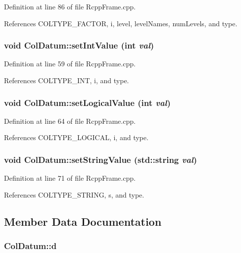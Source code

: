 Definition at line 86 of file RcppFrame.cpp.

References COLTYPE\_\-FACTOR, i, level, levelNames, numLevels, and type.\hypertarget{classColDatum_a80d401e1efb6e714113990c78e72eb84}{
\subsubsection[{setIntValue}]{\setlength{\rightskip}{0pt plus 5cm}void ColDatum::setIntValue (int {\em val})}}
\label{classColDatum_a80d401e1efb6e714113990c78e72eb84}


Definition at line 59 of file RcppFrame.cpp.

References COLTYPE\_\-INT, i, and type.\hypertarget{classColDatum_a19ebd9c0e3e2544c8679999ab91c9e20}{
\subsubsection[{setLogicalValue}]{\setlength{\rightskip}{0pt plus 5cm}void ColDatum::setLogicalValue (int {\em val})}}
\label{classColDatum_a19ebd9c0e3e2544c8679999ab91c9e20}


Definition at line 64 of file RcppFrame.cpp.

References COLTYPE\_\-LOGICAL, i, and type.\hypertarget{classColDatum_aa87060ae6c415167d501c41684d8a586}{
\subsubsection[{setStringValue}]{\setlength{\rightskip}{0pt plus 5cm}void ColDatum::setStringValue (std::string {\em val})}}
\label{classColDatum_aa87060ae6c415167d501c41684d8a586}


Definition at line 71 of file RcppFrame.cpp.

References COLTYPE\_\-STRING, s, and type.

\subsection{Member Data Documentation}
\hypertarget{classColDatum_a01a9fd53a56cf0cafa9c3230a3185c8c}{
\subsubsection[{d}]{ {\bf ColDatum::d}}}
\label{classColDatum_a01a9fd53a56cf0cafa9c3230a3185c8c}


